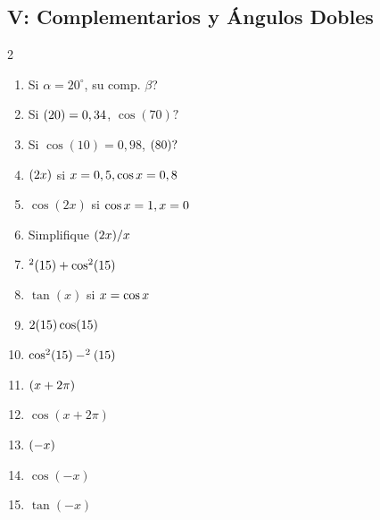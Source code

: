 \documentclass[letterpaper, 12pt]{article}
\let\sin\relax
\DeclareMathOperator{\sin}{sen}
\begin{document}
\subsection*{V: Complementarios y Ángulos Dobles}
\begin{multicols}{2}
\begin{enumerate}[label=\textbf{\arabic*.}, start=71]
    \item Si $\alpha=20^\circ$, su comp. $\beta$?
    \item Si $\sin(20) = 0,34$, $\cos(70)?$
    \item Si $\cos(10) = 0,98$, $\sin(80)?$
    \item $\sin(2x)$ si $\sin x = 0,5, \cos x = 0,8$
    \item $\cos(2x)$ si $\cos x = 1, \sin x = 0$
    \item Simplifique $\sin(2x) / \sin x$
    \item $\sin^2(15) + \cos^2(15)$
    \item $\tan(x)$ si $\sin x = \cos x$
    \item $2\sin(15)\cos(15)$
    \item $\cos^2(15) - \sin^2(15)$
    \item $\sin(x + 2\pi)$
    \item $\cos(x + 2\pi)$
    \item $\sin(-x)$
    \item $\cos(-x)$
    \item $\tan(-x)$
\end{enumerate}
\end{multicols}
\end{document}
